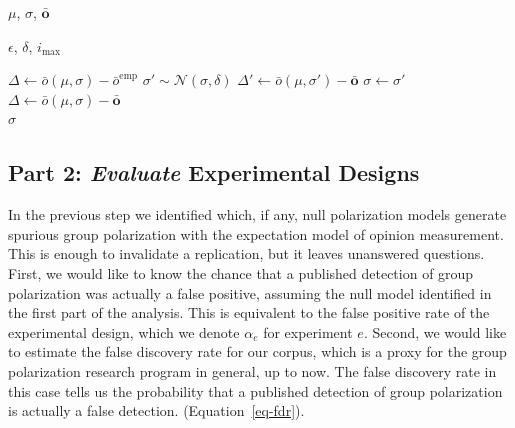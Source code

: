 \documentclass[preview]{article}
\newcommand{\meanobs}{\bar{o}}
\newcommand{\meanobsemp}{\meanobs^\mathrm{emp}}
\begin{document}
\begin{algorithm}
  \caption{Routine to find latent mean and variance that generate spurious group polarization.}
  \label{algo:root-finding}
  \begin{algorithmic}

    \Require $\mu$, $\sigma$, $\bar{\mathbf{o}}$ 

    \Require $\epsilon$, $\delta$, $i_\mathrm{max}$ 

    \State $\Delta \gets \meanobs(\mu, \sigma) - \meanobsemp$ 
     
      \State $\sigma' \sim \mathcal{N}(\sigma, \delta)$ 
      \State $\Delta' \gets \bar{o}(\mu, \sigma') - \bar{\mathbf{o}}$ 
        \State $\sigma \gets \sigma'$
        \State $\Delta \gets \bar{o}(\mu, \sigma) - \bar{\mathbf{o}}$
      \EndIf
    \EndWhile \\

    \Return $\sigma$
  \end{algorithmic}
\end{algorithm}

\subsection{\texorpdfstring{Part 2: \emph{Evaluate} Experimental
Designs}{Part 2: Evaluate Experimental Designs}}\label{part-2-evaluate-experimental-designs}

In the previous step we identified which, if any, null polarization
models generate spurious group polarization with the expectation model
of opinion measurement. This is enough to invalidate a replication, but
it leaves unanswered questions. First, we would like to know 
the chance that a published detection of group polarization was
actually a false positive, assuming the null model identified in the first part of
the analysis. This is equivalent to the false positive rate of the
experimental design, which we denote $\alpha_e$ for experiment $e$.
Second, we would like to estimate the false discovery rate for our
corpus, which is a proxy for the group polarization research program in general, up to now. The false discovery rate in this case tells us the
probability that a published detection of group polarization is actually
a false detection. (Equation~\ref{eq-fdr}).
\end{document}
